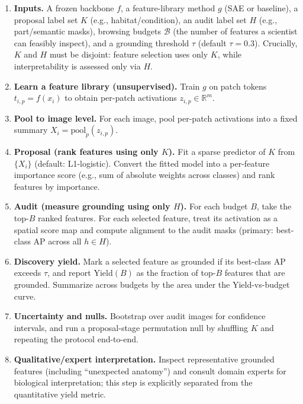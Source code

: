 \documentclass{article}
\theoremstyle{plain}
\theoremstyle{definition}
\theoremstyle{remark}
\begin{document}
\begin{enumerate}
\item \textbf{Inputs.} A frozen backbone $f$, a feature-library method $g$ (SAE or baseline), a proposal label set $K$ (e.g., habitat/condition), an audit label set $H$ (e.g., part/semantic masks), browsing budgets $\mathcal{B}$ (the number of features a scientist can feasibly inspect), and a grounding threshold $\tau$ (default $\tau=0.3$). Crucially, $K$ and $H$ must be disjoint: feature selection uses only $K$, while interpretability is assessed only via $H$.

\item \textbf{Learn a feature library (unsupervised).} Train $g$ on patch tokens $t_{i,p}=f(x_i)$ to obtain per-patch activations $z_{i,p}\in\mathbb{R}^m$.

\item \textbf{Pool to image level.} For each image, pool per-patch activations into a fixed summary $X_i=\mathrm{pool}_p(z_{i,p})$.

\item \textbf{Proposal (rank features using only $K$).} Fit a sparse predictor of $K$ from $\{X_i\}$ (default: L1-logistic). Convert the fitted model into a per-feature importance score (e.g., sum of absolute weights across classes) and rank features by importance.

\item \textbf{Audit (measure grounding using only $H$).} For each budget $B$, take the top-$B$ ranked features. For each selected feature, treat its activation as a spatial score map and compute alignment to the audit masks (primary: best-class AP across all $h\in H$).

\item \textbf{Discovery yield.} Mark a selected feature as grounded if its best-class AP exceeds $\tau$, and report $\mathrm{Yield}(B)$ as the fraction of top-$B$ features that are grounded. Summarize across budgets by the area under the Yield-vs-budget curve.

\item \textbf{Uncertainty and nulls.} Bootstrap over audit images for confidence intervals, and run a proposal-stage permutation null by shuffling $K$ and repeating the protocol end-to-end.

\item \textbf{Qualitative/expert interpretation.} Inspect representative grounded features (including ``unexpected anatomy'') and consult domain experts for biological interpretation; this step is explicitly separated from the quantitative yield metric.
\end{enumerate}
\end{document}
